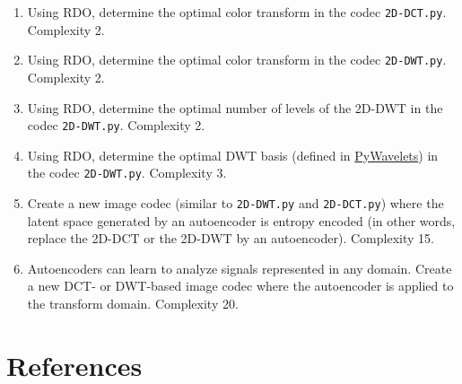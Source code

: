 \begin{enumerate}
\item Using RDO, determine the optimal color transform in the codec
  \texttt{2D-DCT.py}. Complexity 2.
\item Using RDO, determine the optimal color transform in the codec
  \texttt{2D-DWT.py}. Complexity 2.
\item Using RDO, determine the optimal number of levels of the 2D-DWT
  in the codec \texttt{2D-DWT.py}. Complexity 2.
\item Using RDO, determine the optimal DWT basis (defined in
  \href{https://pywavelets.readthedocs.io/en/latest/}{PyWavelets}) in
  the codec \texttt{2D-DWT.py}. Complexity 3.
\item Create a new image codec (similar to \texttt{2D-DWT.py} and
  \texttt{2D-DCT.py}) where the latent space generated by an
  autoencoder is entropy encoded (in other words, replace the 2D-DCT
  or the 2D-DWT by an autoencoder). Complexity 15.
\item Autoencoders can learn to analyze signals represented in any
  domain. Create a new DCT- or DWT-based image codec where the
  autoencoder is applied to the transform domain. Complexity 20.
\end{enumerate}


\section{References}

\renewcommand{\addcontentsline}[3]{}%



